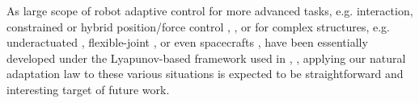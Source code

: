 \documentclass[letterpaper, 10 pt, conference]{ieeeconf}  %
\begin{document}
As large scope of robot adaptive control for more advanced tasks, e.g. interaction, constrained or hybrid position/force control \cite{AC_interaction}, \cite{AC_constrained}, or for complex structures, e.g. underactuated \cite{AC_underactuated}, flexible-joint \cite{AC_flexible}, or even spacecrafts \cite{AC_spacecraft}, have been essentially developed under the Lyapunov-based framework used in \cite{Craig_AdaptiveControl}, \cite{Slotine_AdaptiveControl}, applying our natural adaptation law to these various situations is expected to be straightforward and interesting target of future work.










\end{document}
